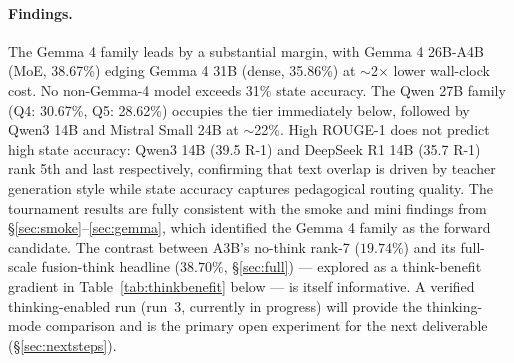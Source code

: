 \documentclass[11pt]{article}
\begin{document}
\paragraph{Findings.}
The Gemma 4 family leads by a substantial margin, with Gemma 4 26B-A4B (MoE, 38.67\%) edging Gemma 4 31B (dense, 35.86\%) at $\sim$2$\times$ lower wall-clock cost. No non-Gemma-4 model exceeds 31\% state accuracy. The Qwen 27B family (Q4: 30.67\%, Q5: 28.62\%) occupies the tier immediately below, followed by Qwen3 14B and Mistral Small 24B at $\sim$22\%. High ROUGE-1 does not predict high state accuracy: Qwen3 14B (39.5 R-1) and DeepSeek R1 14B (35.7 R-1) rank 5th and last respectively, confirming that text overlap is driven by teacher generation style while state accuracy captures pedagogical routing quality. The tournament results are fully consistent with the smoke and mini findings from \S\ref{sec:smoke}--\ref{sec:gemma}, which identified the Gemma 4 family as the forward candidate. The contrast between A3B's no-think rank-7 ($19.74\%$) and its full-scale fusion-think headline ($38.70\%$, \S\ref{sec:full}) --- explored as a think-benefit gradient in Table~\ref{tab:thinkbenefit} below --- is itself informative. A verified thinking-enabled run (run~3, currently in progress) will provide the thinking-mode comparison and is the primary open experiment for the next deliverable (\S\ref{sec:nextsteps}).
\end{document}
